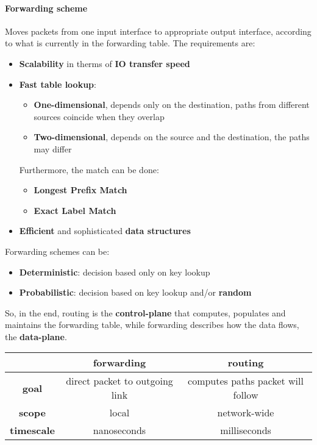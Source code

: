 \paragraph{Forwarding scheme} Moves packets from one input interface to appropriate output interface, according to what is currently in the forwarding table. The requirements are:
\begin{itemize}
	\item \textbf{Scalability} in therms of \textbf{IO transfer speed}
	\item \textbf{Fast table lookup}:
	\begin{itemize}
		\item \textbf{One-dimensional}, depends only on the destination, paths from different sources coincide when they overlap
		\item \textbf{Two-dimensional}, depends on the source and the destination, the paths may differ
	\end{itemize}
	Furthermore, the match can be done:
	\begin{itemize}
		\item \textbf{Longest Prefix Match}
		\item \textbf{Exact Label Match}
	\end{itemize}
	\item \textbf{Efficient} and sophisticated \textbf{data structures}
\end{itemize}
\newpage
\noindent Forwarding schemes can be:
\begin{itemize}
	\item \textbf{Deterministic}: decision based only on key lookup
	\item \textbf{Probabilistic}: decision based on key lookup and/or \textbf{random}
\end{itemize}
So, in the end, routing is the \textbf{control-plane} that computes, populates and maintains the forwarding table, while forwarding describes how the data flows, the \textbf{data-plane}.

\begin{table}[!h]
	\centering
	\begin{tabular}{c|c|c}
		& \textbf{forwarding} & \textbf{routing} \\
		\hline 
		\textbf{goal} & direct packet to outgoing link & computes paths packet will follow \\
		\textbf{scope} & local & network-wide \\
		\textbf{timescale}  & nanoseconds & milliseconds
	\end{tabular}
\end{table}


